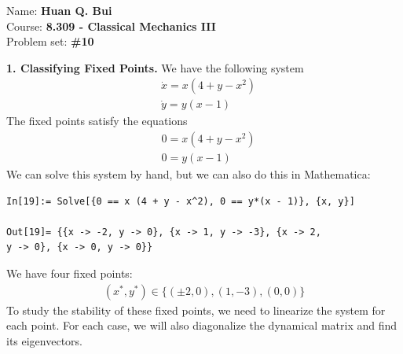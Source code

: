 \documentclass{article}
\theoremstyle{definition}
\begin{document}
	
\begin{framed}
	\noindent Name: \textbf{Huan Q. Bui}\\
	Course: \textbf{8.309 - Classical Mechanics III}\\
	Problem set: \textbf{\#10}
\end{framed}



\noindent \textbf{1. Classifying Fixed Points.} 
We have the following system
\begin{align*}
&\dot x = x(4+y-x^2)\\
&\dot y = y(x-1)
\end{align*} 
The fixed points satisfy the equations
\begin{align*}
&0 = x(4+y-x^2)\\
&0 = y(x-1)
\end{align*}
We can solve this system by hand, but we can also do this in Mathematica:
\begin{lstlisting}
In[19]:= Solve[{0 == x (4 + y - x^2), 0 == y*(x - 1)}, {x, y}]

Out[19]= {{x -> -2, y -> 0}, {x -> 1, y -> -3}, {x -> 2, 
y -> 0}, {x -> 0, y -> 0}}
\end{lstlisting}
We have four fixed points:
\begin{align*}
(x^*, y^*) \in \{ (\pm 2,0),(1,-3),(0,0) \}
\end{align*}
To study the stability of these fixed points, we need to linearize the system for each point. For each case, we will also diagonalize the dynamical matrix and find its eigenvectors. 
\end{document}
